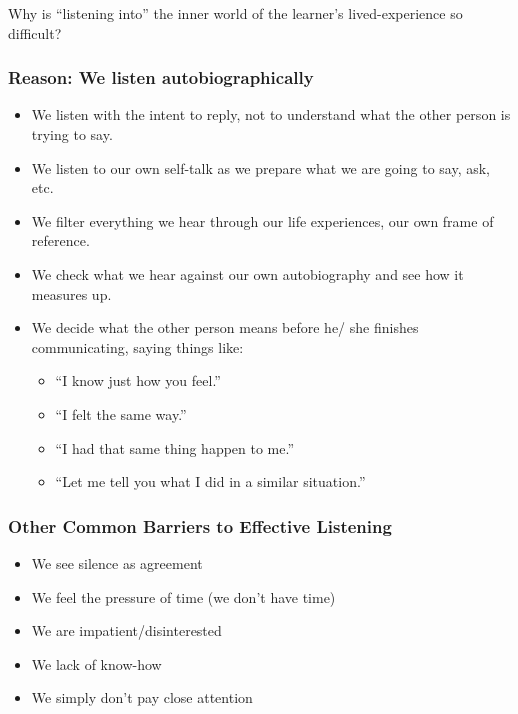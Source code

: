 \documentclass[
]{book}
\providecommand{\tightlist}{%
  \setlength{\itemsep}{0pt}\setlength{\parskip}{0pt}}
\begin{document}
\begin{reflect}
Why is ``listening into'' the inner world of the learner's lived-experience so difficult?
\end{reflect}

\hypertarget{reason-we-listen-autobiographically}{%
\subsubsection*{Reason: We listen autobiographically}\label{reason-we-listen-autobiographically}}

\begin{itemize}
\item
  We listen with the intent to reply, not to understand what the other person is trying to say.
\item
  We listen to our own self-talk as we prepare what we are going to say, ask, etc.
\item
  We filter everything we hear through our life experiences, our own frame of reference.
\item
  We check what we hear against our own autobiography and see how it measures up.
\item
  We decide what the other person means before he/
  she finishes communicating, saying things like:

  \begin{itemize}
  \tightlist
  \item
    ``I know just how you feel.''
  \item
    ``I felt the same way.''
  \item
    ``I had that same thing happen to me.''
  \item
    ``Let me tell you what I did in a similar situation.''
  \end{itemize}
\end{itemize}

\hypertarget{other-common-barriers-to-effective-listening}{%
\subsubsection*{Other Common Barriers to Effective Listening}\label{other-common-barriers-to-effective-listening}}

\begin{itemize}
\tightlist
\item
  We see silence as agreement
\item
  We feel the pressure of time (we don't have time)
\item
  We are impatient/disinterested
\item
  We lack of know-how
\item
  We simply don't pay close attention
\end{itemize}
\end{document}
